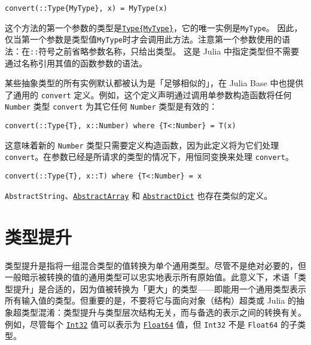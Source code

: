 \begin{verbatim}
convert(::Type{MyType}, x) = MyType(x)
\end{verbatim}



这个方法的第一个参数的类型是\hyperlink{5449736533675714976}{\texttt{Type\{MyType\}}}，它的唯一实例是\texttt{MyType}。 因此，仅当第一个参数是类型值\texttt{MyType}时才会调用此方法。注意第一个参数使用的语法：在\texttt{::}符号之前省略参数名称，只给出类型。 这是 Julia 中指定类型但不需要通过名称引用其值的函数参数的语法。



某些抽象类型的所有实例默认都被认为是「足够相似的」，在 Julia Base 中也提供了通用的 \texttt{convert} 定义。例如，这个定义声明通过调用单参数构造函数将任何 \texttt{Number} 类型 \texttt{convert} 为其它任何 \texttt{Number} 类型是有效的：




\begin{verbatim}
convert(::Type{T}, x::Number) where {T<:Number} = T(x)
\end{verbatim}



这意味着新的 \texttt{Number} 类型只需要定义构造函数，因为此定义将为它们处理 \texttt{convert}。在参数已经是所请求的类型的情况下，用恒同变换来处理 \texttt{convert}。




\begin{verbatim}
convert(::Type{T}, x::T) where {T<:Number} = x
\end{verbatim}



\texttt{AbstractString}、\hyperlink{6514416309183787338}{\texttt{AbstractArray}} 和 \hyperlink{6373987858401217649}{\texttt{AbstractDict}} 也存在类似的定义。



\hypertarget{701866407360133120}{}


\section{类型提升}



类型提升是指将一组混合类型的值转换为单个通用类型。尽管不是绝对必要的，但一般暗示被转换的值的通用类型可以忠实地表示所有原始值。此意义下，术语「类型提升」是合适的，因为值被转换为「更大」的类型——即能用一个通用类型表示所有输入值的类型。但重要的是，不要将它与面向对象（结构）超类或 Julia 的抽象超类型混淆：类型提升与类型层次结构无关，而与备选的表示之间的转换有关。例如，尽管每个 \hyperlink{10103694114785108551}{\texttt{Int32}} 值可以表示为 \hyperlink{5027751419500983000}{\texttt{Float64}} 值，但 \texttt{Int32} 不是 \texttt{Float64} 的子类型。



